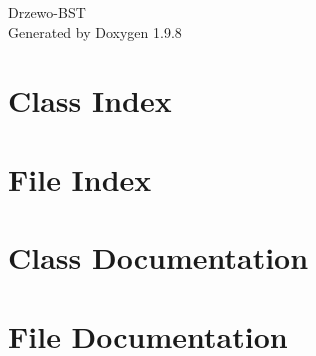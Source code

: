 \documentclass[twoside]{book}
\newcommand{\+}{\discretionary{\mbox{\scriptsize$\hookleftarrow$}}{}{}}
\newcommand{\clearemptydoublepage}{%
    \newpage{\pagestyle{empty}\cleardoublepage}%
  }
\begin{document}
  \raggedbottom
    \hypersetup{pageanchor=false,
                bookmarksnumbered=true,
                pdfencoding=unicode
               }
  \begin{titlepage}
  \vspace*{7cm}
  \begin{center}%
  {\Large Drzewo-\/\+BST}\\
  \vspace*{1cm}
  {\large Generated by Doxygen 1.9.8}\\
  \end{center}
  \end{titlepage}
  \clearemptydoublepage
  \tableofcontents
  \clearemptydoublepage
  \hypersetup{pageanchor=true}
\chapter{Class Index}

\chapter{File Index}

\chapter{Class Documentation}



\chapter{File Documentation}


  \backmatter
  \newpage
  \clearemptydoublepage
  \printindex
\end{document}
